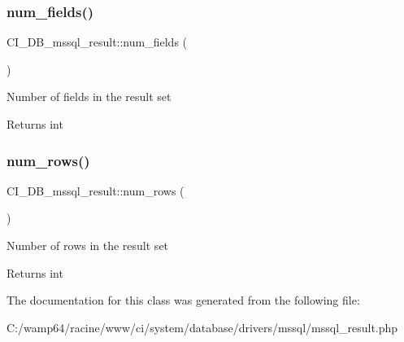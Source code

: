 \subsubsection{\texorpdfstring{num\+\_\+fields()}{num\_fields()}}
{\footnotesize\ttfamily C\+I\+\_\+\+D\+B\+\_\+mssql\+\_\+result\+::num\+\_\+fields (\begin{DoxyParamCaption}{ }\end{DoxyParamCaption})}

Number of fields in the result set

\begin{DoxyReturn}{Returns}
int 
\end{DoxyReturn}
\mbox{\label{class_c_i___d_b__mssql__result_a3ee369815a7eaba62882d23828b50169}} 
\subsubsection{\texorpdfstring{num\+\_\+rows()}{num\_rows()}}
{\footnotesize\ttfamily C\+I\+\_\+\+D\+B\+\_\+mssql\+\_\+result\+::num\+\_\+rows (\begin{DoxyParamCaption}{ }\end{DoxyParamCaption})}

Number of rows in the result set

\begin{DoxyReturn}{Returns}
int 
\end{DoxyReturn}


The documentation for this class was generated from the following file\+:\begin{DoxyCompactItemize}
\item 
C\+:/wamp64/racine/www/ci/system/database/drivers/mssql/mssql\+\_\+result.\+php\end{DoxyCompactItemize}
